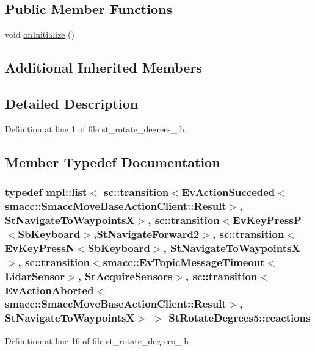 \subsection*{Public Member Functions}
\begin{DoxyCompactItemize}
\item 
void \hyperlink{structStRotateDegrees5_ae97bf7a4c7a7f270bc29642cfd4d49d3}{on\+Initialize} ()
\end{DoxyCompactItemize}
\subsection*{Additional Inherited Members}


\subsection{Detailed Description}


Definition at line 1 of file st\+\_\+rotate\+\_\+degrees\+\_.\+h.



\subsection{Member Typedef Documentation}
\subsubsection[{\texorpdfstring{reactions}{reactions}}]{\setlength{\rightskip}{0pt plus 5cm}typedef mpl\+::list$<$ sc\+::transition$<$Ev\+Action\+Succeded$<$smacc\+::\+Smacc\+Move\+Base\+Action\+Client\+::\+Result$>$, {\bf St\+Navigate\+To\+WaypointsX}$>$, sc\+::transition$<$Ev\+Key\+PressP$<$Sb\+Keyboard$>$,{\bf St\+Navigate\+Forward2}$>$, sc\+::transition$<$Ev\+Key\+PressN$<$Sb\+Keyboard$>$, {\bf St\+Navigate\+To\+WaypointsX}$>$, sc\+::transition$<${\bf smacc\+::\+Ev\+Topic\+Message\+Timeout}$<${\bf Lidar\+Sensor}$>$, {\bf St\+Acquire\+Sensors}$>$, sc\+::transition$<$Ev\+Action\+Aborted$<$smacc\+::\+Smacc\+Move\+Base\+Action\+Client\+::\+Result$>$, {\bf St\+Navigate\+To\+WaypointsX}$>$ $>$ {\bf St\+Rotate\+Degrees5\+::reactions}}\hypertarget{structStRotateDegrees5_a21d2794b9a04b90ba2abc2f3e8e3b14d}{}\label{structStRotateDegrees5_a21d2794b9a04b90ba2abc2f3e8e3b14d}


Definition at line 16 of file st\+\_\+rotate\+\_\+degrees\+\_.\+h.



